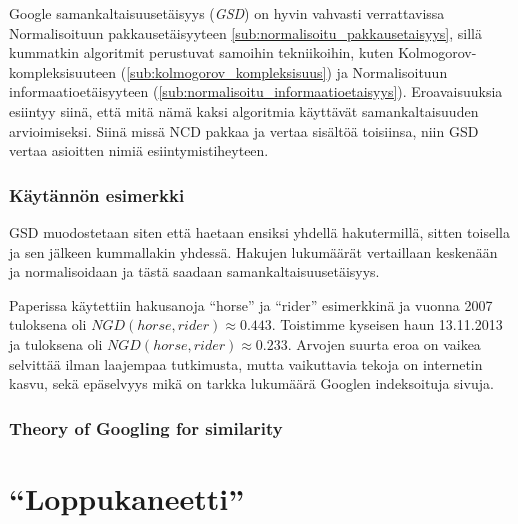 \documentclass[12pt,finnish,draft]{tktltiki2}
\theoremstyle{definition}
\theoremstyle{remark}
\begin{document}
    Google samankaltaisuusetäisyys (\emph{GSD}) on hyvin vahvasti verrattavissa Normalisoituun pakkausetäisyyteen \ref{sub:normalisoitu_pakkausetaisyys}, sillä kummatkin algoritmit perustuvat samoihin tekniikoihin, kuten Kolmogorov-kompleksisuuteen (\ref{sub:kolmogorov_kompleksisuus}) ja Normalisoituun informaatioetäisyyteen (\ref{sub:normalisoitu_informaatioetaisyys}).
    Eroavaisuuksia esiintyy siinä, että mitä nämä kaksi algoritmia käyttävät samankaltaisuuden arvioimiseksi.
    Siinä missä NCD pakkaa ja vertaa sisältöä toisiinsa, niin GSD vertaa asioitten nimiä esiintymistiheyteen.

    \subsubsection{Käytännön esimerkki} %
    \label{ssub:kaytannon_esimerkki}
      GSD muodostetaan siten että haetaan ensiksi yhdellä hakutermillä, sitten toisella ja sen jälkeen kummallakin yhdessä.
      Hakujen lukumäärät vertaillaan keskenään ja normalisoidaan ja tästä saadaan samankaltaisuusetäisyys.

      Paperissa \cite{cilibrasi2007google} käytettiin hakusanoja ``horse'' ja ``rider'' esimerkkinä ja vuonna 2007 tuloksena oli $NGD(horse, rider) \approx 0.443$.
      Toistimme kyseisen haun 13.11.2013 ja tuloksena oli $NGD(horse, rider) \approx 0.233$.
      Arvojen suurta eroa on vaikea selvittää ilman laajempaa tutkimusta, mutta vaikuttavia tekoja on internetin kasvu, sekä epäselvyys mikä on tarkka lukumäärä Googlen indeksoituja sivuja.


    \subsubsection{Theory of Googling for similarity} %
    \label{ssub:theory_of_googling_for_similarity}





\section{``Loppukaneetti''} %
\label{sec:loppukaneetti}
\end{document}
